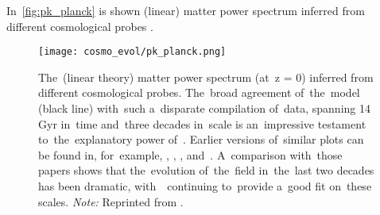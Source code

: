 In~\autoref{fig:pk_planck} is shown (linear) matter power spectrum inferred from different cosmological probes \parencite{2018arXiv180706205P}.
\begin{figure}[hbt]
    \centering
    \texttt{[image: cosmo\_evol/pk\_planck.png]}
    \caption{The~(linear theory) matter power spectrum (at~z = 0) inferred from different cosmological probes. The~broad agreement of~the~model (black line) with~such a~disparate compilation of~data, spanning 14 Gyr in~time and~three decades in~scale is an~impressive testament to~the~explanatory power of~\LCDM. Earlier versions of~similar plots can be found in, for~example, \textcite{1994ARA&A..32..319W}, \textcite{1995Sci...268..829S}, \textcite{2002PhRvD..66j3508T}, and~\textcite{2004ApJ...606..702T}. A~comparison with~those papers shows that the~evolution of~the~field in~the~last two decades has been dramatic, with~\LCDM\ continuing to~provide a~good fit on~these scales. \textit{Note:} Reprinted from \textcite{2018arXiv180706205P}.}
    \label{fig:pk_planck}
\end{figure}

